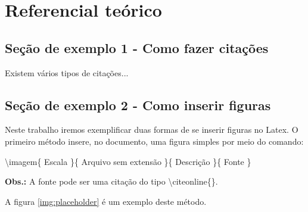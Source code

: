 \chapter{Referencial teórico}

\section{Seção de exemplo 1 - Como fazer citações}

Existem vários tipos de citações...


\section{Seção de exemplo 2 - Como inserir figuras}

Neste trabalho iremos exemplificar duas formas de se inserir figuras no Latex. O primeiro método insere, no documento, uma figura simples por meio do comando:

\textbackslash imagem\{ Escala \}\{ Arquivo sem extensão \}\{ Descrição \}\{ Fonte \}

\textbf{Obs.:} A fonte pode ser uma citação do tipo  \textbackslash citeonline\{\}.

A figura \ref{img:placeholder} é um exemplo deste método.


